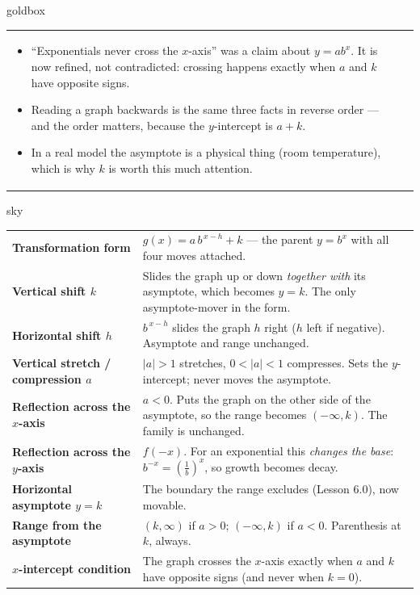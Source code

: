 \documentclass[10pt]{article}
\begin{document}
\begin{skillbox}{goldbox}
\begin{tabularx}{\linewidth}{@{}X|X@{}}
\begin{itemize}[leftmargin=1.1em, nosep, after=\vspace{2pt}]
  \item ``Exponentials never cross the $x$-axis'' was a claim about $y=ab^{x}$. It is now refined, not contradicted: crossing happens exactly when $a$ and $k$ have opposite signs.
  \item Reading a graph backwards is the same three facts in reverse order --- and the order matters, because the $y$-intercept is $a+k$.
  \item In a real model the asymptote is a physical thing (room temperature), which is why $k$ is worth this much attention.
\end{itemize}
\end{tabularx}
\end{skillbox}

\begin{skillbox}{sky}
\renewcommand{\arraystretch}{1.3}
\begin{tabularx}{\linewidth}{@{}l X@{}}
\textbf{Transformation form} & $g(x)=a\,b^{\,x-h}+k$ --- the parent $y=b^{x}$ with all four moves attached. \\
\textbf{Vertical shift $k$} & Slides the graph up or down \emph{together with} its asymptote, which becomes $y=k$. The only asymptote-mover in the form. \\
\textbf{Horizontal shift $h$} & $b^{\,x-h}$ slides the graph $h$ right ($h$ left if negative). Asymptote and range unchanged. \\
\textbf{Vertical stretch / compression $a$} & $|a|>1$ stretches, $0<|a|<1$ compresses. Sets the $y$-intercept; never moves the asymptote. \\
\textbf{Reflection across the $x$-axis} & $a<0$. Puts the graph on the other side of the asymptote, so the range becomes $(-\infty,k)$. The family is unchanged. \\
\textbf{Reflection across the $y$-axis} & $f(-x)$. For an exponential this \emph{changes the base}: $b^{-x}=\left(\frac1b\right)^{x}$, so growth becomes decay. \\
\textbf{Horizontal asymptote $y=k$} & The boundary the range excludes (Lesson 6.0), now movable. \\
\textbf{Range from the asymptote} & $(k,\infty)$ if $a>0$; $(-\infty,k)$ if $a<0$. Parenthesis at $k$, always. \\
\textbf{$x$-intercept condition} & The graph crosses the $x$-axis exactly when $a$ and $k$ have opposite signs (and never when $k=0$). \\
\end{tabularx}
\end{skillbox}
\end{document}
